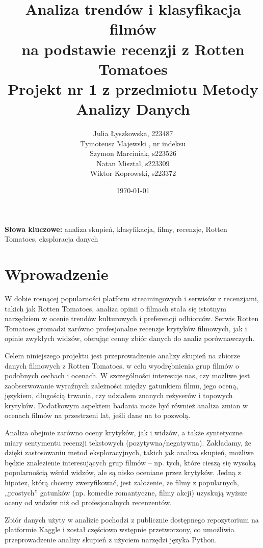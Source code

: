 \documentclass[a4paper,12pt]{article}
\title{Analiza trendów i klasyfikacja filmów\\na podstawie recenzji z Rotten Tomatoes\\\large Projekt nr 1 z przedmiotu Metody Analizy Danych}
\author{Julia Łyszkowska, 223487 \\Tymoteusz Majewski , nr indeksu\\Szymon Marciniak, s223526\\Natan Misztal, s223309\\Wiktor Koprowski, s223372}
\date{\today}
\begin{document}
\maketitle

\begin{abstract}
\end{abstract}

\noindent \textbf{Słowa kluczowe:} analiza skupień, klasyfikacja, filmy, recenzje, Rotten Tomatoes, eksploracja danych

\section{Wprowadzenie}

W dobie rosnącej popularności platform streamingowych i serwisów z recenzjami, takich jak Rotten Tomatoes, analiza opinii o filmach stała się istotnym narzędziem w ocenie trendów kulturowych i preferencji odbiorców. Serwis Rotten Tomatoes gromadzi zarówno profesjonalne recenzje krytyków filmowych, jak i opinie zwykłych widzów, oferując cenny zbiór danych do analiz porównawczych. 

Celem niniejszego projektu jest przeprowadzenie analizy skupień na zbiorze danych filmowych z Rotten Tomatoes, w celu wyodrębnienia grup filmów o podobnych cechach i ocenach. W szczególności interesuje nas, czy możliwe jest zaobserwowanie wyraźnych zależności między gatunkiem filmu, jego oceną, językiem, długością trwania, czy udziałem znanych reżyserów i topowych krytyków. Dodatkowym aspektem badania może być również analiza zmian w ocenach filmów na przestrzeni lat, jeśli dane na to pozwolą.

Analiza obejmie zarówno oceny krytyków, jak i widzów, a także syntetyczne miary sentymentu recenzji tekstowych (pozytywna/negatywna). Zakładamy, że dzięki zastosowaniu metod eksploracyjnych, takich jak analiza skupień, możliwe będzie znalezienie interesujących grup filmów – np. tych, które cieszą się wysoką popularnością wśród widzów, ale są nisko oceniane przez krytyków. Jedną z hipotez, którą chcemy zweryfikować, jest założenie, że filmy z popularnych, „prostych” gatunków (np. komedie romantyczne, filmy akcji) uzyskują wyższe oceny od widzów niż od profesjonalnych recenzentów.

Zbiór danych użyty w analizie pochodzi z publicznie dostępnego repozytorium na platformie Kaggle i został częściowo wstępnie przetworzony, co umożliwia przeprowadzenie analizy skupień z użyciem narzędzi języka Python.
\end{document}
